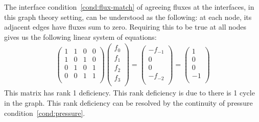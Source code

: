 \documentclass[10pt,twocolumn,letterpaper]{article}
\begin{document}
The interface condition~\ref{cond:flux-match} of agreeing fluxes at the interfaces, 
in this graph theory setting, can be understood as the following: 
at each node, its adjacent edges have fluxes sum to zero. Requiring this to be true at all nodes gives us
the following linear system of equations:
\begin{align}
  \begin{pmatrix}
    1 & 1 & 0 & 0\\
    1 & 0 & 1 & 0\\
    0 & 1 & 0 & 1\\
    0 & 0 & 1 & 1\\
  \end{pmatrix}
  \begin{pmatrix}
    f_0\\
    f_1\\
    f_2\\
    f_3\\
  \end{pmatrix}
  =
  \begin{pmatrix}
    -f_{-1}\\
    0\\
    0\\
    -f_{-2}\\
  \end{pmatrix}
  =
  \begin{pmatrix}
    1\\
    0\\
    0\\
    -1\\
  \end{pmatrix} \label{eq:interface-flux-match}
\end{align}
This matrix has rank 1 deficiency. 
This rank deficiency is due to there is 1 cycle in the graph. 
This rank deficiency can be resolved by the continuity of pressure condition~\ref{cond:pressure}. 
\end{document}
